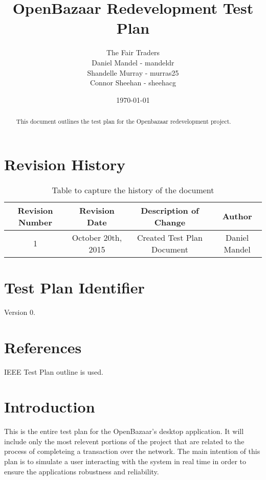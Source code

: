 \documentclass{article}
\begin{document}
\title{OpenBazaar Redevelopment Test Plan}
\author{The Fair Traders \\ Daniel Mandel - mandeldr \\ Shandelle Murray - murras25 \\ Connor Sheehan - sheehacg}
\date{\today}
\maketitle

\begin{abstract}
This document outlines the test plan for the Openbazaar redevelopment project.
\end{abstract}

\clearpage

\tableofcontents

\clearpage

\section*{Revision History}

\begin{table}[h!]
\centering
\begin{tabular}{||c c c c||} 
 \hline
 Revision Number & Revision Date & Description of Change & Author \\ [0.5ex] 
 \hline\hline
 1 & October 20th, 2015 & Created Test Plan Document & Daniel Mandel \\ [1ex] 
 \hline
\end{tabular}
\caption{Table to capture the history of the document}
\label{table:1}
\end{table}


\section*{Test Plan Identifier}
Version 0.

\section*{References}
IEEE Test Plan outline is used.

\section*{Introduction}
This is the entire test plan for the OpenBazaar's desktop application.
It will include only the most relevent portions of the project that are related to
the process of completeing a transaction over the network.
The main intention of this plan is to simulate a user interacting with the system in real time in order to ensure the applications robustness and reliability.
\end{document}
